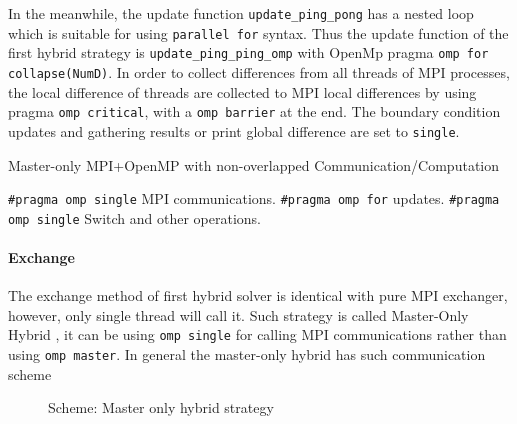 In the meanwhile, the update function \texttt{update\_ping\_pong} has a nested loop which is suitable for using \texttt{parallel for} syntax.
Thus the update function of the first hybrid strategy is \texttt{update\_ping\_ping\_omp} with OpenMp pragma 
\texttt{omp for collapse(NumD)}.
In order to collect differences from all threads of MPI processes, the local difference of threads are collected to MPI local differences
by using pragma \texttt{omp critical}, with a \texttt{omp barrier} at the end.
The boundary condition updates and gathering results or print global difference are set to \texttt{single}.
\begin{algorithm}
  \caption{Master-only MPI+OpenMP with non-overlapped Communication/Computation}
  \label{ALG:Hybrid_0}
  \begin{algorithmic}[1]
      \STATE \texttt{\#pragma omp single}
      \STATE MPI communications.
        \STATE \texttt{\#pragma omp for} updates.
      \ENDFOR
      \STATE \texttt{\#pragma omp single} Switch and other operations.
    \ENDFOR
  \end{algorithmic}
\end{algorithm}




\paragraph{Exchange}
The exchange method of first hybrid solver is identical with pure MPI exchanger, however, only single thread will call it.
Such strategy is called Master-Only Hybrid 
                                                      \cite{Master-Only}, 
it can be using \texttt{omp single} for calling MPI communications
rather than using \texttt{omp master}.
In general the master-only hybrid has such communication scheme
\begin{figure}[htbp]
  \centering
  \caption{Scheme: Master only hybrid strategy}
  \label{FIG:master_only_hybrid}
\end{figure}


